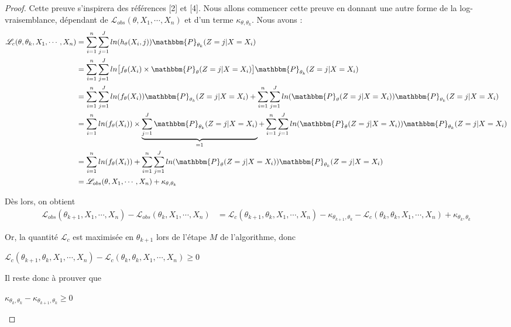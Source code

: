 \documentclass[frenchb]{report}
\newcommand{\1}{\mathbbm{1}}
\newcommand{\prob}{\mathbbm{P}}
\newcommand{\lv}{\mathcal{L}}
\theoremstyle{definition}\newtheorem{defn}{Définition}
\theoremstyle{definition}\newtheorem{exm}{Exemple}
\theoremstyle{definition}\newtheorem{nota}{Notation}
\theoremstyle{definition}\newtheorem{rem}{Remarque}
\begin{document}
\begin{proof}
Cette preuve s'inspirera des références [2] et [4].\newline
Nous allons commencer cette preuve en donnant une autre forme de la log-vraisemblance, dépendant de $\lv_ {obs}(\theta, X_1, \cdots, X_n)$ et d'un terme $\kappa_{\theta,\theta_k}$. Nous avons :
\begin{align*}
\lv_c(\theta, \theta_k, X_1, \cdots, X_n) &=  \displaystyle\sum_{i=1}^n\sum_{j=1}^J ln(h_\theta(X_i ,j))  \prob_{\theta_k}(Z = j|X = X_i)\\
&=  \displaystyle\sum_{i=1}^n\sum_{j=1}^J ln\big[f_\theta(X_i)\times \prob_\theta(Z = j|X=X_i)\big]\prob_{\theta_k}(Z = j|X = X_i)\\
&=  \displaystyle\sum_{i=1}^n\sum_{j=1}^J ln(f_\theta(X_i))\prob_{\theta_k}(Z = j|X = X_i) + \sum_{i=1}^n\sum_{j=1}^J ln(\prob_\theta(Z = j|X=X_i))\prob_{\theta_k}(Z = j|X = X_i)\\
&= \displaystyle\sum_{i=1}^n ln(f_\theta(X_i))\times\underbrace{\sum_{j=1}^J \prob_{\theta_k}(Z = j|X = X_i)}_{=1} + \sum_{i=1}^n\sum_{j=1}^J ln(\prob_\theta(Z = j|X = X_i))\prob_{\theta_k}(Z = j|X = X_i)\\
&= \displaystyle\sum_{i=1}^n ln(f_\theta(X_i)) + \sum_{i=1}^n\sum_{j=1}^J ln(\prob_\theta(Z = j|X=X_i))\prob_{\theta_k}(Z = j|X = X_i) \\
&= \lv_{obs}(\theta, X_1, \cdots, X_n) + \kappa_{\theta,\theta_k}
\end{align*}

Dès lors, on obtient
\begin{align*}
\lv_{obs}(\theta_{k+1}, X_1, \cdots, X_n) - \lv_{obs}(\theta_k, X_1, \cdots, X_n) &= \lv_c(\theta_{k+1}, \theta_k, X_1, \cdots, X_n) - \kappa_{\theta_{k+1}, \theta_k} -  \lv_c(\theta_k, \theta_k, X_1, \cdots, X_n) + \kappa_{\theta_{k}, \theta_k}
\end{align*}

Or, la quantité $\lv_c$ est maximisée en $\theta_{k+1}$ lors de l'étape $M$ de l'algorithme, donc
\begin{center} $ \lv_c(\theta_{k+1}, \theta_k, X_1, \cdots, X_n) - \lv_c(\theta_k, \theta_k, X_1, \cdots, X_n) \geq 0$ \end{center}

Il reste donc à prouver que 
\begin{center} $\kappa_{\theta_{k}, \theta_k}-\kappa_{\theta_{k+1}, \theta_k} \geq 0$ \end{center}


\end{proof}
\end{document}
